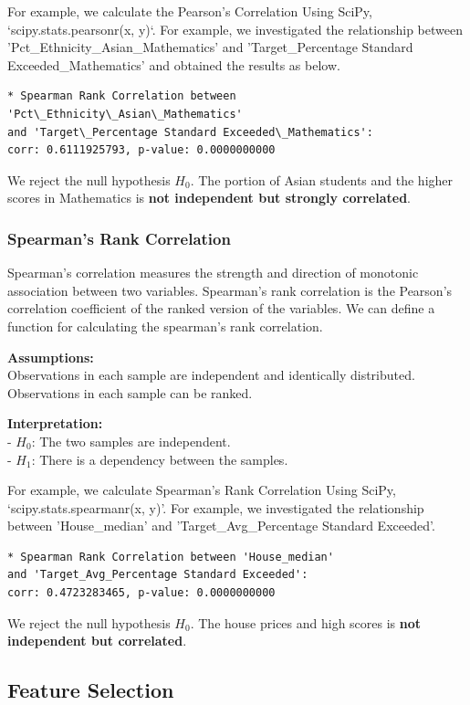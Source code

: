 \documentclass[11pt]{article}
\begin{document}
For example, we calculate the Pearson's Correlation Using SciPy, `scipy.stats.pearsonr(x, y)`.  
For example, we investigated the relationship between 'Pct\_Ethnicity\_Asian\_Mathematics' and 'Target\_Percentage Standard Exceeded\_Mathematics' and obtained the results as below.
\begin{verbatim}
* Spearman Rank Correlation between 'Pct\_Ethnicity\_Asian\_Mathematics'
and 'Target\_Percentage Standard Exceeded\_Mathematics':
corr: 0.6111925793, p-value: 0.0000000000
\end{verbatim}
We reject the null hypothesis $H_0$.
The portion of Asian students and the higher scores in Mathematics is \textbf{not independent but strongly correlated}.

\subsubsection{Spearman's Rank Correlation}

Spearman's correlation measures the strength and direction of monotonic association between two variables. Spearman’s rank correlation is the Pearson’s correlation coefficient of the ranked version of the variables. We can define a function for calculating the spearman's rank correlation.

\noindent \textbf{Assumptions:}\\
Observations in each sample are independent and identically distributed. Observations in each sample can be ranked.

\noindent \textbf{Interpretation:}\\
\indent - $H_0$: The two samples are independent.\\
\indent - $H_1$: There is a dependency between the samples.

For example, 
we calculate Spearman’s Rank Correlation Using SciPy, `scipy.stats.spearmanr(x, y)'.
For example, we investigated the relationship between 'House\_median' and 'Target\_Avg\_Percentage Standard Exceeded'.
\begin{verbatim}
* Spearman Rank Correlation between 'House_median' 
and 'Target_Avg_Percentage Standard Exceeded':
corr: 0.4723283465, p-value: 0.0000000000
\end{verbatim}
We reject the null hypothesis $H_0$.
The house prices and high scores is \textbf{not independent but correlated}.

\subsection{Feature Selection}
\end{document}
